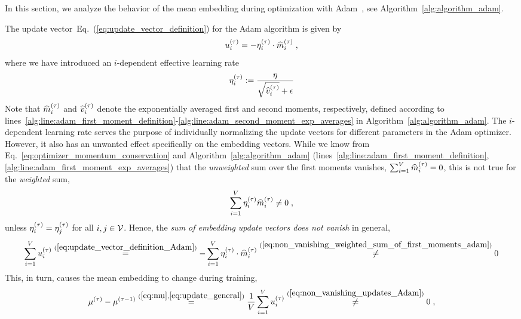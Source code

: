In this section, we analyze the behavior of the mean embedding during optimization with Adam~\cite{adam}, see Algorithm~\ref{alg:algorithm_adam}.

The update vector~Eq.~(\ref{eq:update_vector_definition}) for the Adam algorithm is given by
\begin{equation}
    u_i^{(\tau)} 
    = 
    - \eta^{(\tau)}_i \cdot \widehat{m}_i^{(\tau)} \label{eq:update_vector_definition_Adam}  \; ,
\end{equation}
where we have introduced an $i$-dependent effective learning rate 
\begin{equation}
    \eta^{(\tau)}_i
    := 
    \frac{\eta}{\sqrt{\widehat{v}_i^{(\tau)}} + \epsilon} \label{eq:adam_learning_rate} 
\end{equation}
Note that $\widehat{m}_i^{(\tau)}$ and $\widehat{v}_i^{(\tau)}$ denote the exponentially averaged first and second moments, respectively, defined according to lines~\ref{alg:line:adam_first_moment_definition}-\ref{alg:line:adam_second_moment_exp_averages}
in Algorithm~\ref{alg:algorithm_adam}.
The $i$-dependent learning rate serves the purpose of individually normalizing the update vectors for different parameters in the Adam optimizer.
However, it also has an unwanted effect specifically on the embedding vectors. While we know from Eq.~\eqref{eq:optimizer_momentum_conservation} and Algorithm~\ref{alg:algorithm_adam} (lines~\ref{alg:line:adam_first_moment_definition},\ref{alg:line:adam_first_moment_exp_averages}) that the {\em unweighted} sum over the first moments vanishes, 
$\sum_{i=1}^V \widehat{m}_i^{(\tau)} = 0$,
this is not true for the {\em weighted} sum,
\begin{equation}
\sum_{i=1}^V \eta^{(\tau)}_i \widehat{m}_i^{(\tau)} \neq 0 \; ,
\label{eq:non_vanishing_weighted_sum_of_first_moments_adam}
\end{equation}
unless $\eta^{(\tau)}_i = \eta^{(\tau)}_j$ for all $i, j \in \mathcal{V}$.
Hence, the \textit{sum of embedding update vectors does not vanish} in general,
\begin{equation}
\sum_{i=1}^V  u_i^{(\tau)}
\stackrel{(\ref{eq:update_vector_definition_Adam})}{=} - \sum_{i=1}^V \eta^{(\tau)}_i \cdot \widehat{m}_i^{(\tau)} 
\stackrel{(\ref{eq:non_vanishing_weighted_sum_of_first_moments_adam})}{\neq} 0
\label{eq:non_vanishing_updates_Adam}
\end{equation}
This, in turn, causes the mean embedding to change during training,
\begin{equation} 
    \mu^{(\tau)} - \mu^{(\tau-1)} 
    \stackrel{(\ref{eq:mu},\ref{eq:update_general})}{=} 
    \frac{1}{V} \sum_{i=1}^V u_i^{(\tau)}
    \stackrel{(\ref{eq:non_vanishing_updates_Adam})}{\neq} 0 \; ,
    \label{eq:mean_embedding_change_adam}
\end{equation}
